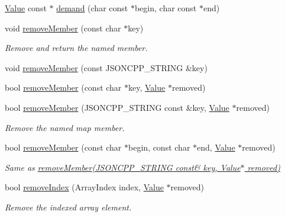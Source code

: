 \begin{DoxyCompactItemize}
\item 
\hyperlink{classJson_1_1Value}{Value} const  $\ast$ \hyperlink{classJson_1_1Value_afeb7ff596a0929d90c5f2f3cffb413ed}{demand} (char const $\ast$begin, char const $\ast$end)
\item 
void \hyperlink{classJson_1_1Value_a92e165f04105d27a930fb3a18a053585}{remove\+Member} (const char $\ast$key)
\begin{DoxyCompactList}\small\item\em Remove and return the named member. \end{DoxyCompactList}\item 
void \hyperlink{classJson_1_1Value_a8a660202bbad35857b39e85bd35ec78a}{remove\+Member} (const J\+S\+O\+N\+C\+P\+P\+\_\+\+S\+T\+R\+I\+NG \&key)
\item 
bool \hyperlink{classJson_1_1Value_a708e599489adf30d65bf85a8ee16e6fb}{remove\+Member} (const char $\ast$key, \hyperlink{classJson_1_1Value}{Value} $\ast$removed)
\item 
bool \hyperlink{classJson_1_1Value_ae385ecef98427970df525ee876e9f54a}{remove\+Member} (J\+S\+O\+N\+C\+P\+P\+\_\+\+S\+T\+R\+I\+NG const \&key, \hyperlink{classJson_1_1Value}{Value} $\ast$removed)
\begin{DoxyCompactList}\small\item\em Remove the named map member. \end{DoxyCompactList}\item 
\mbox{\label{classJson_1_1Value_a49c91af727d6b4eb0af02a81bb2def87}} 
bool \hyperlink{classJson_1_1Value_a49c91af727d6b4eb0af02a81bb2def87}{remove\+Member} (const char $\ast$begin, const char $\ast$end, \hyperlink{classJson_1_1Value}{Value} $\ast$removed)
\begin{DoxyCompactList}\small\item\em Same as \hyperlink{classJson_1_1Value_ae385ecef98427970df525ee876e9f54a}{remove\+Member(\+J\+S\+O\+N\+C\+P\+P\+\_\+\+S\+T\+R\+I\+N\+G const\& key, Value$\ast$ removed)} \end{DoxyCompactList}\item 
bool \hyperlink{classJson_1_1Value_a64160c23c1f2f8b33913364f25d6c58d}{remove\+Index} (Array\+Index index, \hyperlink{classJson_1_1Value}{Value} $\ast$removed)
\begin{DoxyCompactList}\small\item\em Remove the indexed array element. \end{DoxyCompactList}\item 

\end{DoxyCompactItemize}

